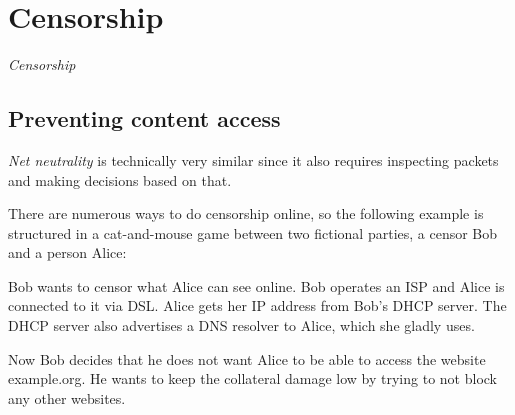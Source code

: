 \section{Censorship}
\textit{Censorship} \cite{wiki:Censorship} 

\subsection{Preventing content access}
\textit{Net neutrality} \cite{wiki:Net_neutrality} is technically very similar since it also requires inspecting packets and making decisions based on that.

There are numerous ways to do censorship online, so the following example is structured in a cat-and-mouse game between two fictional parties, a censor Bob and a person Alice:

Bob wants to censor what Alice can see online.
Bob operates an ISP and Alice is connected to it via DSL. Alice gets her IP address from Bob's DHCP server.
The DHCP server also advertises a DNS resolver to Alice, which she gladly uses.

Now Bob decides that he does not want Alice to be able to access the website example.org.
He wants to keep the collateral damage low by trying to not block any other websites.

